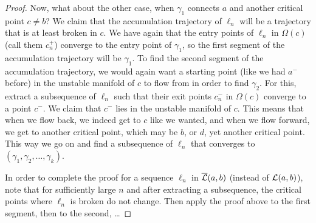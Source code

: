 \begin{proof}
    Now, what about the other case, when $\gamma_1$ connects $a$ and another critical point $c \neq b$?
    We claim that the accumulation trajectory of $\ell_n$ will be a trajectory that is at least broken in $c$.
We have again that the entry points of $\ell_n$ in $\Omega(c)$ (call them $c_n^{+}$) converge to the entry point of $\gamma_1$, so the first segment of the accumulation trajectory will be $\gamma_1$.
To find the second segment of the accumulation trajectory, we would again want a starting point (like we had $a^{-}$ before) in the unstable manifold of $c$ to flow from in order to find $\gamma_{2}$.
For this, extract a subsequence of $\ell_n$ such that their exit points $c^{-}_n$ in $\Omega(c)$ converge to a point $c^{-}$.
We claim that $c^{-}$ lies in the unstable manifold of $c$.
This means that when we flow back, we indeed get to $c$ like we wanted, and when we flow forward, we get to another critical point, which may be $b$, or $d$, yet another critical point. This way we go on and find a subsequence of $\ell_n$ that converges to $(\gamma_1, \gamma_2, \ldots, \gamma_k)$.

In order to complete the proof for a sequence $\ell_n$ in $ \overline{\mathcal L}(a, b)$ (instead of $\mathcal L(a, b)$), note that for sufficiently large $n$ and after extracting a subsequence, the critical points where $ \ell_n$ is broken do not change. Then apply the proof above to the first segment, then to the second, \ldots
\end{proof}



